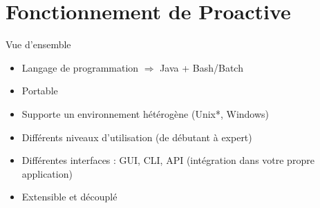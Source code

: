 \documentclass{beamer}
\begin{document}
\section[Fonctionnement]{Fonctionnement de Proactive}
\begin{frame}
	\tableofcontents[currentsection]
\end{frame}
\begin{frame}{Vue d'ensemble}
    \begin{itemize}
        \item Langage de programmation $\Longrightarrow$ Java + Bash/Batch
        \item Portable
        \item Supporte un environnement hétérogène (Unix*, Windows)%
        \item Différents niveaux d'utilisation (de débutant à expert) %
        \item Différentes interfaces : GUI, CLI, API (intégration dans votre propre application)
        \item Extensible et découplé
    \end{itemize}

\end{frame}
\end{document}
